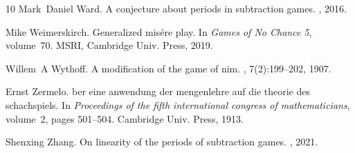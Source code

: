 \documentclass{amsart}
\theoremstyle{plain}
\theoremstyle{definition}
\begin{document}
\begin{thebibliography}{10}
Mark~Daniel Ward.
\newblock A conjecture about periods in subtraction games.
, 2016.

Mike Weimerskirch.
\newblock Generalized mis\'ere play.
\newblock In {\em Games of No Chance 5}, volume~70. MSRI, Cambridge Univ.
  Press, 2019.

Willem~A Wythoff.
\newblock A modification of the game of nim.
, 7(2):199--202, 1907.

Ernst Zermelo.
ber eine anwendung der mengenlehre auf die theorie des
  schachspiels.
\newblock In {\em Proceedings of the fifth international congress of
  mathematicians}, volume~2, pages 501--504. Cambridge Univ. Press, 1913.

Shenxing Zhang.
\newblock On linearity of the periods of subtraction games.
, 2021.

\end{thebibliography}
\end{document}
